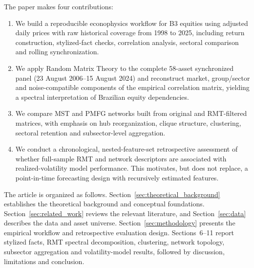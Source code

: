 The paper makes four contributions:
\begin{enumerate}
  \item We build a reproducible econophysics workflow for B3 equities using adjusted daily prices with raw historical coverage from 1998 to 2025, including return construction, stylized-fact checks, correlation analysis, sectoral comparison and rolling synchronization.
  \item We apply Random Matrix Theory to the complete 58-asset synchronized panel (23 August 2006--15 August 2024) and reconstruct market, group/sector and noise-compatible components of the empirical correlation matrix, yielding a spectral interpretation of Brazilian equity dependencies.
  \item We compare MST and PMFG networks built from original and RMT-filtered matrices, with emphasis on hub reorganization, clique structure, clustering, sectoral retention and subsector-level aggregation.
  \item We conduct a chronological, nested-feature-set retrospective assessment of whether full-sample RMT and network descriptors are associated with realized-volatility model performance. This motivates, but does not replace, a point-in-time forecasting design with recursively estimated features.
\end{enumerate}

The article is organized as follows. Section~\ref{sec:theoretical_background} establishes the theoretical background and conceptual foundations. Section~\ref{sec:related_work} reviews the relevant literature, and Section~\ref{sec:data} describes the data and asset universe. Section~\ref{sec:methodology} presents the empirical workflow and retrospective evaluation design. Sections~6--11 report stylized facts, RMT spectral decomposition, clustering, network topology, subsector aggregation and volatility-model results, followed by discussion, limitations and conclusion.
